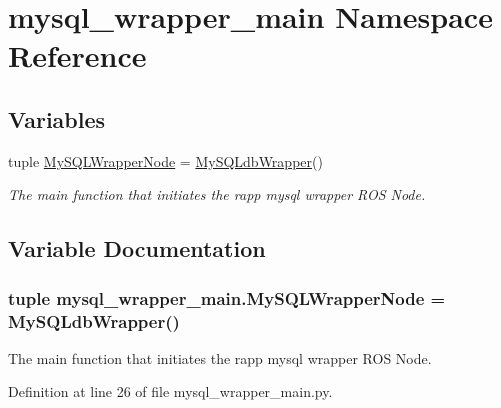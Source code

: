 \hypertarget{namespacemysql__wrapper__main}{\section{mysql\-\_\-wrapper\-\_\-main Namespace Reference}
\label{namespacemysql__wrapper__main}
}
\subsection*{Variables}
\begin{DoxyCompactItemize}
\item 
tuple \hyperlink{namespacemysql__wrapper__main_a168b1afc2608b144cd98ea4aac4b4639}{My\-S\-Q\-L\-Wrapper\-Node} = \hyperlink{classmysql__wrapper_1_1MySQLdbWrapper}{My\-S\-Q\-Ldb\-Wrapper}()
\begin{DoxyCompactList}\small\item\em The main function that initiates the rapp mysql wrapper R\-O\-S Node. \end{DoxyCompactList}\end{DoxyCompactItemize}


\subsection{Variable Documentation}
\hypertarget{namespacemysql__wrapper__main_a168b1afc2608b144cd98ea4aac4b4639}{
\subsubsection[{My\-S\-Q\-L\-Wrapper\-Node}]{\setlength{\rightskip}{0pt plus 5cm}tuple mysql\-\_\-wrapper\-\_\-main.\-My\-S\-Q\-L\-Wrapper\-Node = {\bf My\-S\-Q\-Ldb\-Wrapper}()}}\label{namespacemysql__wrapper__main_a168b1afc2608b144cd98ea4aac4b4639}


The main function that initiates the rapp mysql wrapper R\-O\-S Node. 



Definition at line 26 of file mysql\-\_\-wrapper\-\_\-main.\-py.

